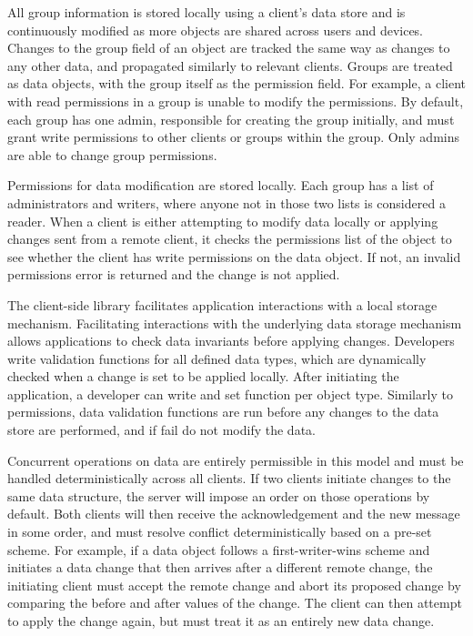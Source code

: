 All group information is stored locally using a client's data store and is continuously modified as more objects are shared across users and devices.
Changes to the group field of an object are tracked the same way as changes to any other data, and propagated similarly to relevant clients. Groups are treated as \name{} data objects, with the group itself as the permission field. For example, a client with read permissions in a group is unable to modify the permissions. By default, each group has one admin, responsible for creating the group initially, and must grant write permissions to other clients or groups within the group. Only admins are able to change group permissions.

Permissions for data modification are stored locally. Each group has a list of administrators and writers, where anyone not in those two lists is considered a reader. When a client is either attempting to modify data locally or applying changes sent from a remote client, it checks the permissions list of the object to see whether the client has write permissions on the data object. If not, an invalid permissions error is returned and the change is not applied. 



The \name{} client-side library facilitates application interactions with a local storage mechanism. Facilitating interactions with the underlying data storage mechanism allows \name{} applications to check data invariants before applying changes. Developers write validation functions for all defined data types, which are dynamically checked when a change is set to be applied locally. After initiating the application, a developer can write and set function per object type. Similarly to permissions, data validation functions are run before any changes to the data store are performed, and if fail do not modify the data.

Concurrent operations on data are entirely permissible in this model and must be handled deterministically across all clients. If two clients initiate changes to the same data structure, the server will impose an order on those operations by default. Both clients will then receive the acknowledgement and the new message in some order, and must resolve conflict deterministically based on a pre-set scheme. For example, if a data object follows a first-writer-wins scheme and initiates a data change that then arrives after a different remote change, the initiating client must accept the remote change and abort its proposed change by comparing the before and after values of the change. The client can then attempt to apply the change again, but must treat it as an entirely new data change.

